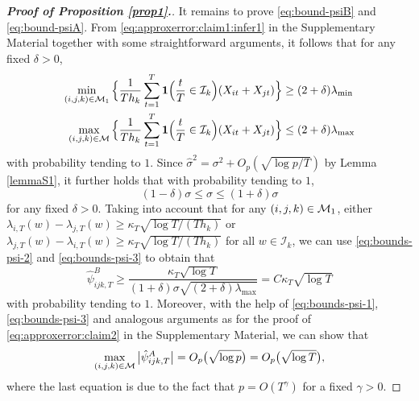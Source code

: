 \documentclass[a4paper,12pt]{article}
\numberwithin{equation}{section}
\begin{document}
{\begin{proof}[\textnormal{\textbf{Proof of Proposition \ref{prop1}.}}]
It remains to prove \eqref{eq:bound-psiB} and \eqref{eq:bound-psiA}. From \eqref{eq:approxerror:claim1:infer1} in the Supplementary Material together with some straightforward arguments, it follows that for any fixed $\delta > 0$,
\begin{align}
\min_{(i,j,k) \in \mathcal{M}_1} \Big\{ \frac{1}{Th_k} \sum\limits_{t=1}^T \boldsymbol{1}\Big(\frac{t}{T} \in \mathcal{I}_k\Big) (X_{it} + X_{jt}) \Big\} & \ge (2 + \delta) \lambda_{\min} \label{eq:bounds-psi-1} \\
\max_{(i,j,k) \in \mathcal{M}} \Big\{ \frac{1}{Th_k} \sum\limits_{t=1}^T \boldsymbol{1}\Big(\frac{t}{T} \in \mathcal{I}_k\Big) (X_{it} + X_{jt}) \Big\} & \le (2 + \delta) \lambda_{\max} \label{eq:bounds-psi-2}
\end{align}
with probability tending to $1$. Since $\hat{\sigma}^2 = \sigma^2 + O_p(\sqrt{\log p/T})$ by Lemma \ref{lemmaS1}, it further holds that with probability tending to $1$, 
\begin{equation}\label{eq:bounds-psi-3}
(1-\delta) \sigma \le \hat{\sigma} \le (1+\delta) \sigma 
\end{equation}
for any fixed $\delta > 0$. Taking into account that for any $(i,j,k) \in \mathcal{M}_1$, either $\lambda_{i, T}(w) - \lambda_{j, T}(w) \ge \kappa_T \sqrt{\log T / (T h_{k})}$ or $\lambda_{j, T}(w) - \lambda_{i, T}(w) \ge \kappa_T \sqrt{\log T / (T h_{k})}$ for all $w \in \mathcal{I}_{k}$, we can use \eqref{eq:bounds-psi-2} and \eqref{eq:bounds-psi-3} to obtain that 
\begin{equation*}
\hat{\psi}_{ijk,T}^B \ge \frac{\kappa_T\sqrt{\log T}}{(1+\delta) \sigma \sqrt{ (2+\delta) \lambda_{\max}}} = C\kappa_T\sqrt{\log T}
\end{equation*}
with probability tending to $1$. Moreover, with the help of \eqref{eq:bounds-psi-1}, \eqref{eq:bounds-psi-3} and analogous arguments as for the proof of \eqref{eq:approxerror:claim2} in the Supplementary Material, we can show that
\begin{equation*}
\max_{(i,j,k) \in \mathcal{M}} \big|\hat\psi_{ijk,T}^A\big| = O_p\big(\sqrt{\log p}\big) = O_p\big(\sqrt{\log T}\big),
\end{equation*}
where the last equation is due to the fact that $p = O(T^{\gamma})$ for a fixed $\gamma > 0$. 
\end{proof}
}




{\small
\setlength{\bibsep}{0.35em}
}
\end{document}
